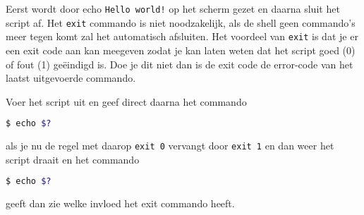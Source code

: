 Eerst wordt door echo \texttt{Hello world!} op het scherm gezet en daarna sluit het script af. Het \texttt{exit} commando is niet noodzakelijk, als de shell geen commando's meer tegen komt zal het automatisch afsluiten. Het voordeel van \texttt{exit} is dat je er een exit code aan kan meegeven zodat je kan laten weten dat het script goed (0) of fout (1) ge\"eindigd is. Doe je dit niet dan is de exit code de error-code van het laatst uitgevoerde commando.

Voer het script uit en geef direct daarna het commando
\begin{lstlisting}[language=bash]
$ echo $?
\end{lstlisting}
als je nu de regel met daarop \texttt{exit 0} vervangt door \texttt{exit 1} en dan weer het script draait en het commando
\begin{lstlisting}[language=bash]
$ echo $?
\end{lstlisting}
geeft dan zie welke invloed het exit commando heeft.
